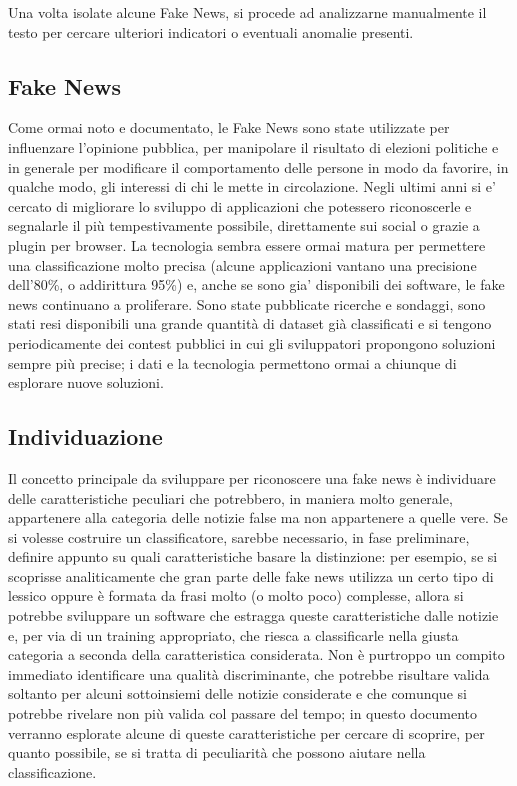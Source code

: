 \documentclass{article}
\begin{document}
	    Una volta isolate alcune Fake News, si procede ad analizzarne manualmente il testo per cercare ulteriori indicatori o eventuali anomalie presenti.
	    
	    \newpage
	    
    \begin{multicols}{2}
	    \section{Fake News}
			Come ormai noto e documentato, le Fake News sono state utilizzate per influenzare l'opinione pubblica, per manipolare il risultato di elezioni politiche e in generale per modificare il comportamento delle persone in modo da favorire, in qualche modo, gli interessi di chi le mette in circolazione.
			Negli ultimi anni si e' cercato di migliorare lo sviluppo di applicazioni che potessero riconoscerle e segnalarle il più tempestivamente possibile, direttamente sui social o grazie a plugin per browser. La tecnologia sembra essere ormai matura per permettere una classificazione molto precisa (alcune applicazioni vantano una precisione dell'80\%, o addirittura 95\%) \cite{fakenewschallenge} e, anche se sono gia' disponibili dei software, le fake news continuano a proliferare.
			Sono state pubblicate ricerche e sondaggi, sono stati resi disponibili una grande quantità di dataset già classificati e si tengono periodicamente dei contest pubblici in cui gli sviluppatori propongono soluzioni sempre più precise; i dati e la tecnologia permettono ormai a chiunque di esplorare nuove soluzioni.
			
			\subsection{Individuazione}
			Il concetto principale da sviluppare per riconoscere una fake news è individuare delle caratteristiche peculiari che potrebbero, in maniera molto generale, appartenere alla categoria delle notizie false ma non appartenere a quelle vere. Se si volesse costruire un classificatore, sarebbe necessario, in fase preliminare, definire appunto su quali caratteristiche basare la distinzione: per esempio, se si scoprisse analiticamente che gran parte delle fake news utilizza un certo tipo di lessico oppure è formata da frasi molto (o molto poco) complesse, allora si potrebbe sviluppare un software che estragga queste caratteristiche dalle notizie e, per via di un training appropriato, che riesca a classificarle nella giusta categoria a seconda della caratteristica considerata.
			Non è purtroppo un compito immediato identificare una qualità discriminante, che potrebbe risultare valida soltanto per alcuni sottoinsiemi delle notizie considerate e che comunque si potrebbe rivelare non più valida col passare del tempo; in questo documento verranno esplorate alcune di queste caratteristiche per cercare di scoprire, per quanto possibile, se si tratta di peculiarità che possono aiutare nella classificazione.
	    

\end{multicols}
\end{document}
